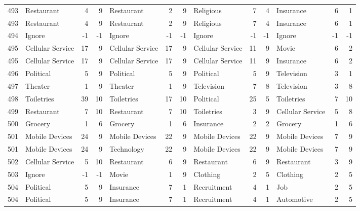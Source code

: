 \begin{figure}[htbp]
\begin{tabular}{rlrrlrrlrrlrr}
    493   & Restaurant & 4     & 9     & Restaurant & 2     & 9     & Religious & 7     & 4     & Insurance & 6     & 1 \\
    493   & Restaurant & 4     & 9     & Restaurant & 2     & 9     & Religious & 7     & 4     & Insurance & 6     & 1 \\
    494   & Ignore & -1    & -1    & Ignore & -1    & -1    & Ignore & -1    & -1    & Ignore & -1    & -1 \\
    495   & Cellular Service & 17    & 9     & Cellular Service & 17    & 9     & Cellular Service & 11    & 9     & Movie & 6     & 2 \\
    495   & Cellular Service & 17    & 9     & Cellular Service & 17    & 9     & Cellular Service & 11    & 9     & Insurance & 6     & 2 \\
    496   & Political & 5     & 9     & Political & 5     & 9     & Political & 5     & 9     & Television & 3     & 1 \\
    497   & Theater & 1     & 9     & Theater & 1     & 9     & Television & 7     & 8     & Television & 3     & 8 \\
    498   & Toiletries & 39    & 10    & Toiletries & 17    & 10    & Political & 25    & 5     & Toiletries & 7     & 10 \\
    499   & Restaurant & 7     & 10    & Restaurant & 7     & 10    & Toiletries & 3     & 9     & Cellular Service & 5     & 8 \\
    500   & Grocery & 1     & 6     & Grocery & 1     & 6     & Insurance & 2     & 2     & Grocery & 1     & 6 \\
    501   & Mobile Devices & 24    & 9     & Mobile Devices & 22    & 9     & Mobile Devices & 22    & 9     & Mobile Devices & 7     & 9 \\
    501   & Mobile Devices & 24    & 9     & Technology & 22    & 9     & Mobile Devices & 22    & 9     & Mobile Devices & 7     & 9 \\
    502   & Cellular Service & 5     & 10    & Restaurant & 6     & 9     & Restaurant & 6     & 9     & Restaurant & 3     & 9 \\
    503   & Ignore & -1    & -1    & Movie & 1     & 9     & Clothing & 2     & 5     & Clothing & 2     & 5 \\
    504   & Political & 5     & 9     & Insurance & 7     & 1     & Recruitment & 4     & 1     & Job   & 2     & 5 \\
    504   & Political & 5     & 9     & Insurance & 7     & 1     & Recruitment & 4     & 1     & Automotive & 2     & 5 \\

\end{tabular}
\end{figure}
